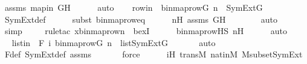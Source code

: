 \begin{isabellebody}
\ assms\ mapin\ GH\isanewline
\ \ \ \ \isamarkupfalse%
\ auto\isanewline
\isanewline
\ \ \isamarkupfalse%
\ rowin\ {\isacharcolon}{\kern0pt}\ {\isachardoublequoteopen}binmap{\isacharunderscore}{\kern0pt}row{\isacharparenleft}{\kern0pt}G{\isacharcomma}{\kern0pt}\ n{\isacharparenright}{\kern0pt}\ {\isasymin}\ SymExt{\isacharparenleft}{\kern0pt}G{\isacharparenright}{\kern0pt}{\isachardoublequoteclose}\ \isanewline
\ \ \ \ \isamarkupfalse%
\ SymExt{\isacharunderscore}{\kern0pt}def\ \isanewline
\ \ \ \ \isamarkupfalse%
{\isacharparenleft}{\kern0pt}subst\ binmap{\isacharunderscore}{\kern0pt}row{\isacharunderscore}{\kern0pt}eq{\isacharparenright}{\kern0pt}\isanewline
\ \ \ \ \isamarkupfalse%
\ nH\ assms\ GH\isanewline
\ \ \ \ \ \ \isamarkupfalse%
\ auto{\isacharbrackleft}{\kern0pt}{}{\isacharbrackright}{\kern0pt}\isanewline
\ \ \ \ \isamarkupfalse%
\ simp\isanewline
\ \ \ \ \isamarkupfalse%
{\isacharparenleft}{\kern0pt}rule{\isacharunderscore}{\kern0pt}tac\ x{\isacharequal}{\kern0pt}{\isachardoublequoteopen}binmap{\isacharunderscore}{\kern0pt}row{\isacharprime}{\kern0pt}{\isacharparenleft}{\kern0pt}n{\isacharparenright}{\kern0pt}{\isachardoublequoteclose}\ \ bexI{\isacharparenright}{\kern0pt}\isanewline
\ \ \ \ \isamarkupfalse%
\ binmap{\isacharunderscore}{\kern0pt}row{\isacharprime}{\kern0pt}{\isacharunderscore}{\kern0pt}HS\ nH\isanewline
\ \ \ \ \isamarkupfalse%
\ auto\isanewline
\isanewline
\ \ \isamarkupfalse%
\ \isamarkupfalse%
\ listin{\isacharprime}{\kern0pt}\ {\isacharcolon}{\kern0pt}\ {\isachardoublequoteopen}{\isacharbrackleft}{\kern0pt}F{\isacharcomma}{\kern0pt}\ i{\isacharcomma}{\kern0pt}\ binmap{\isacharunderscore}{\kern0pt}row{\isacharparenleft}{\kern0pt}G{\isacharcomma}{\kern0pt}\ n{\isacharparenright}{\kern0pt}{\isacharbrackright}{\kern0pt}\ {\isasymin}\ list{\isacharparenleft}{\kern0pt}SymExt{\isacharparenleft}{\kern0pt}G{\isacharparenright}{\kern0pt}{\isacharparenright}{\kern0pt}{\isachardoublequoteclose}\ \isanewline
\ \ \ \ \isamarkupfalse%
\ auto\isanewline
\ \ \ \ \isamarkupfalse%
\ F{\isacharunderscore}{\kern0pt}def\ SymExt{\isacharunderscore}{\kern0pt}def\ assms\isanewline
\ \ \ \ \ \isamarkupfalse%
\ force\isanewline
\ \ \ \ \isamarkupfalse%
\ iH\ transM\ nat{\isacharunderscore}{\kern0pt}in{\isacharunderscore}{\kern0pt}M\ M{\isacharunderscore}{\kern0pt}subset{\isacharunderscore}{\kern0pt}SymExt\isanewline

\end{isabellebody}
